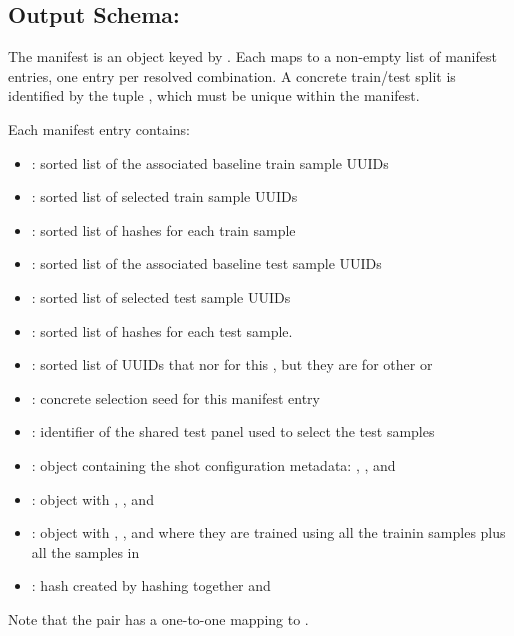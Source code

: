\documentclass[11pt]{article}
\begin{document}
\label{sec:sample-manifest-json-schema}
\subsection*{Output Schema: }
The manifest is an object keyed by . Each  maps to a non-empty list of manifest entries, one entry per resolved  combination.
A concrete train/test split is identified by the tuple , which must be unique within the manifest.

Each manifest entry contains:
\begin{itemize}
\item {}: sorted list of the associated baseline train sample UUIDs
\item {}: sorted list of selected train sample UUIDs
\item {}: sorted list of hashes for each train sample
\item {}: sorted list of the associated baseline test sample UUIDs
\item {}: sorted list of selected test sample UUIDs
\item {}: sorted list of hashes for each test sample.
\item {}: sorted list of UUIDs that  nor  for this , but they are for other  or 
\item {}: concrete selection seed for this manifest entry
\item {}: identifier of the shared test panel used to select the test samples
\item {}: object containing the shot configuration metadata: , , and 
\item {}: object with , , and 
\item {}: object with , , and  where they are trained using all the trainin samples plus all the samples in 
\item {}: hash created by hashing together  and 
\end{itemize}
Note that the pair  has a one-to-one mapping to .
\end{document}
